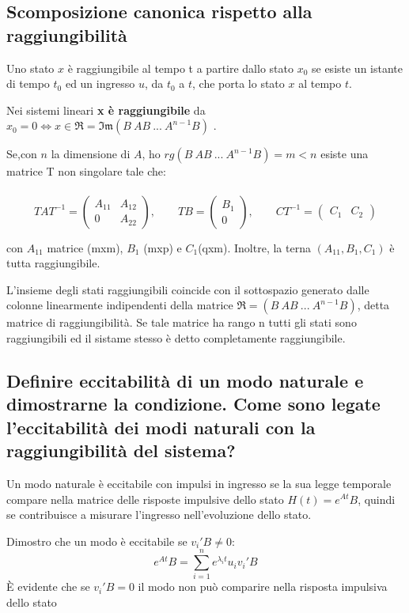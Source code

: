 \documentclass{article}
\begin{document}
\subsection{Scomposizione canonica rispetto alla raggiungibilità}
Uno stato $x$ è raggiungibile al tempo t a partire dallo stato $x_0$ se esiste un istante di tempo $t_0 $
ed un ingresso $u$, da $t_0$ a $t$, che porta lo stato $x$ al tempo $t$.

Nei sistemi lineari {\color{blue} \textbf{x è raggiungibile}} da
$x_0=0 \Longleftrightarrow x \in \mathfrak{R} = \mathfrak{Im}(B\ AB\ ...\ A^{n-1}B)$ .

Se,con $n$ la dimensione di $A$, ho $rg(B\ AB\ ...\ A^{n-1}B)=m<n$ esiste una matrice T non singolare tale che:\\\\
\[
TAT^{-1}= \begin{pmatrix}
A_{11} & A_{12}\\
0 & A_{22}
\end{pmatrix}
,
\hspace{2em}
TB = \begin{pmatrix}
B_1\\
0
\end{pmatrix}
,
\hspace{2em}
CT^{-1} = \begin{pmatrix}
C_1 & C_2
\end{pmatrix}
\]

con $A_{11}$ matrice (mxm), $B_1$ (mxp) e $C_1$(qxm). Inoltre, la terna $(A_{11},B_1,C_1)$ è tutta raggiungibile.

L'insieme degli stati raggiungibili coincide con il sottospazio generato dalle colonne
linearmente indipendenti della matrice $\mathfrak{R}=(B\ AB\ ...\ A^{n-1}B)$, 
detta matrice di raggiungibilità. Se tale matrice ha rango n tutti gli stati sono raggiungibili
ed il sistame stesso è detto completamente raggiungibile.


\subsection{Definire eccitabilità di un modo naturale e dimostrarne la condizione. Come sono legate l'eccitabilità dei modi naturali con la raggiungibilità del sistema?}
Un modo naturale è eccitabile con impulsi in ingresso se la sua legge temporale compare
nella matrice delle risposte impulsive dello stato $ H(t)=e^{A t}B$,
quindi se contribuisce a misurare l'ingresso nell'evoluzione dello stato.

Dimostro che un modo è eccitabile se $v_i'B\neq 0$:
\[ e^{At}B = \sum_{i=1}^{n}e^{\lambda_i t} u_i v_i'B \]
È evidente che se  $v_i'B = 0$ il modo non può comparire nella risposta impulsiva dello stato
\end{document}
